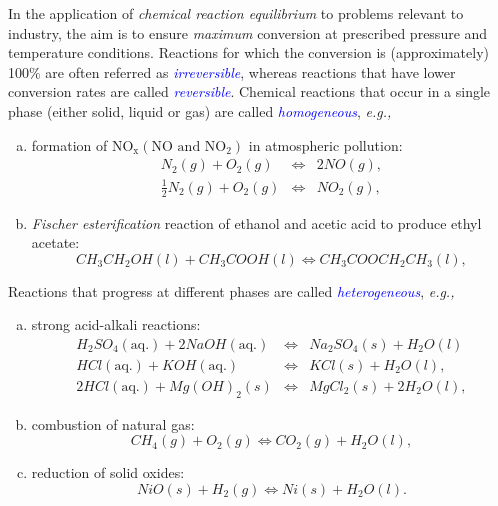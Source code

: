 \documentclass[12pts,a4paper,amsmath,amssymb,floatfix]{article}%
\newcommand{\blue}{\textcolor{blue}}
\newcommand{\eg}{{\it e.g., }}
\newcounter{reaction}
\begin{document}
In the application of {\it chemical reaction equilibrium} to problems relevant to industry, the aim is to ensure {\it maximum} conversion at prescribed pressure and temperature conditions. Reactions for which the conversion is (approximately) 100$\%$ are often referred as \blue{\it irreversible}, whereas reactions that have lower conversion rates are called \blue{\it reversible}. Chemical reactions that occur in a single phase (either solid, liquid or gas) are called \blue{\it homogeneous}, \eg
\begin{enumerate}[a)]
    \item formation of NO$_{\text{x}} \left(\text{NO and NO}_{2}\right)$ in atmospheric pollution:
        \begin{eqnarray}
           N_{2} (g) + O_{2} (g) &\Longleftrightarrow& 2 NO (g), \nonumber \\
           \frac{1}{2} N_{2} (g) + O_{2} (g) &\Longleftrightarrow& NO_{2} (g), \nonumber
        \end{eqnarray}
    \item {\it Fischer esterification} reaction of ethanol and acetic acid to produce ethyl acetate:
        \begin{displaymath}
           CH_{3}CH_{2}OH (l) + CH_{3}COOH (l) \Longleftrightarrow CH_{3}COOCH_{2}CH_{3} (l),
        \end{displaymath}
\end{enumerate}
Reactions that progress at different phases are called \blue{\it heterogeneous}, \eg
\begin{enumerate}[a)]
    \item strong acid-alkali reactions:
        \begin{eqnarray}
           H_{2}SO_{4} (\text{aq.}) + 2 NaOH (\text{aq.}) &\Longleftrightarrow&  Na_{2}SO_{4} (s) + H_{2}O (l) \nonumber \\
           HCl (\text{aq.}) + KOH (\text{aq.}) &\Longleftrightarrow& KCl (s) + H_{2}O (l), \nonumber \\
           2 HCl (\text{aq.}) + Mg(OH)_{2} (s)  &\Longleftrightarrow& MgCl_{2} (s) + 2 H_{2}O (l), \nonumber 
        \end{eqnarray}
    \item combustion of natural gas:
        \begin{displaymath}
           CH_{4} (g) + O_{2} (g) \Longleftrightarrow CO_{2} (g) + H_{2}O (l),
        \end{displaymath}
    \item reduction of solid oxides:
        \begin{displaymath}
           NiO (s) + H_{2} (g) \Longleftrightarrow Ni (s) + H_{2}O (l). 
        \end{displaymath}        
\end{enumerate}
\end{document}
